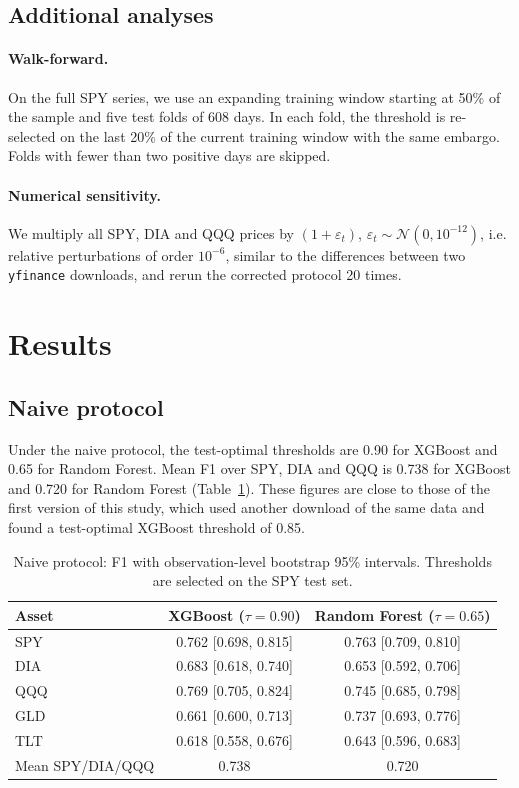 \documentclass[11pt,a4paper]{article}
\begin{document}
\subsection{Additional analyses}

\paragraph{Walk-forward.} On the full SPY series, we use an expanding training window starting
at 50\% of the sample and five test folds of 608 days. In each fold, the threshold is re-selected
on the last 20\% of the current training window with the same embargo. Folds with fewer than two
positive days are skipped.

\paragraph{Numerical sensitivity.} We multiply all SPY, DIA and QQQ prices by $(1+\varepsilon_t)$,
$\varepsilon_t\sim\mathcal{N}(0,10^{-12})$, i.e. relative perturbations of order $10^{-6}$, similar
to the differences between two \texttt{yfinance} downloads, and rerun the corrected protocol
20 times.

\section{Results}\label{sec:results}

\subsection{Naive protocol}

Under the naive protocol, the test-optimal thresholds are 0.90 for XGBoost and 0.65 for Random
Forest. Mean F1 over SPY, DIA and QQQ is 0.738 for XGBoost and 0.720 for Random Forest
(Table~\ref{tab:naive}). These figures are close to those of the first version of this study,
which used another download of the same data and found a test-optimal XGBoost threshold of 0.85.

\begin{table}[h]
\centering
\begin{tabular}{lcc}
\toprule
Asset & XGBoost ($\tau=0.90$) & Random Forest ($\tau=0.65$) \\
\midrule
SPY & 0.762 [0.698, 0.815] & 0.763 [0.709, 0.810] \\
DIA & 0.683 [0.618, 0.740] & 0.653 [0.592, 0.706] \\
QQQ & 0.769 [0.705, 0.824] & 0.745 [0.685, 0.798] \\
GLD & 0.661 [0.600, 0.713] & 0.737 [0.693, 0.776] \\
TLT & 0.618 [0.558, 0.676] & 0.643 [0.596, 0.683] \\
\midrule
Mean SPY/DIA/QQQ & 0.738 & 0.720 \\
\bottomrule
\end{tabular}
\caption{Naive protocol: F1 with observation-level bootstrap 95\% intervals. Thresholds are
selected on the SPY test set.}
\label{tab:naive}
\end{table}
\end{document}
